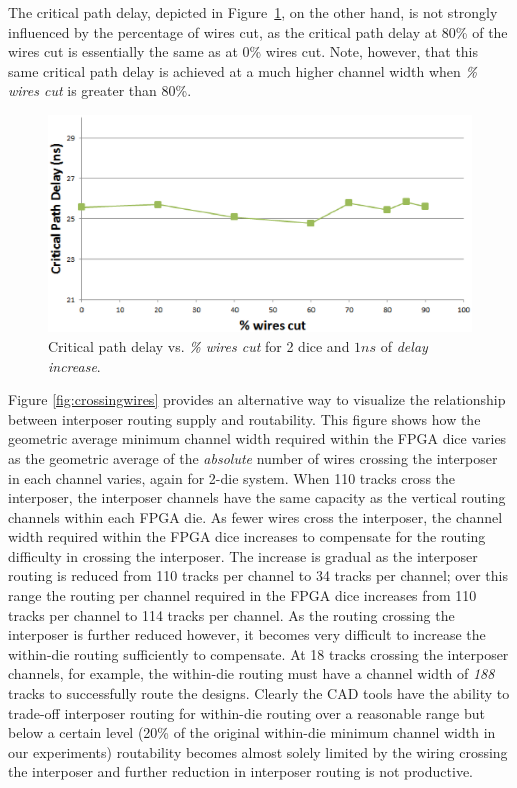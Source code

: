 \documentclass{sig-alternate-2013}
\begin{document}
The critical path delay, depicted in Figure~\ref{fig:standard_crit}, on the other hand, is not strongly influenced by the percentage of wires cut, as the critical path delay at 80\% of the wires cut is essentially the same as at 0\% wires cut. Note, however, that this same critical path delay is achieved at a much higher channel width when \textit{\% wires cut} is greater than 80\%.

\begin{figure}[!htbp]
\centering
\includegraphics[width=\linewidth]{standard_crit_path_new.eps}
\caption{Critical path delay vs. \textit{\% wires cut} for 2 dice and $1ns$ of \textit{delay increase}.}
\label{fig:standard_crit}
\end{figure}

Figure \ref{fig:crossingwires} provides an alternative way to visualize the relationship between interposer routing supply and routability. This figure shows how the geometric average minimum channel width required within the FPGA dice varies as the geometric average of the \emph{absolute} number of wires crossing the interposer in each channel varies, again for 2-die system. When 110 tracks cross the interposer, the interposer channels have the same capacity as the vertical routing channels within each FPGA die. As fewer wires cross the interposer, the channel width required within the FPGA dice increases to compensate for the routing difficulty in crossing the interposer. The increase is gradual as the interposer routing is reduced from 110 tracks per channel to 34 tracks per channel; over this range the routing per channel required in the FPGA dice increases from 110 tracks per channel to 114 tracks per channel. As the routing crossing the interposer is further reduced however, it becomes very difficult to increase the within-die routing sufficiently to compensate. At 18 tracks crossing the interposer channels, for example, the within-die routing must have a channel width of \emph{188} tracks to successfully route the designs. Clearly the CAD tools have the ability to trade-off interposer routing for within-die routing over a reasonable range but below a certain level (20\% of the original within-die minimum channel width in our experiments) routability becomes almost solely limited by the wiring crossing the interposer and further reduction in interposer routing is not productive.
\end{document}
